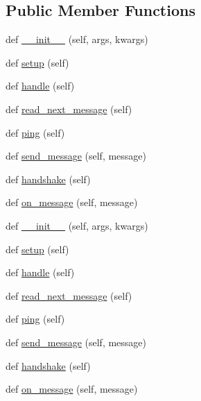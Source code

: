 \subsection*{Public Member Functions}
\begin{DoxyCompactItemize}
\item 
def \hyperlink{classremi_1_1server_1_1WebSocketsHandler_a371b691e09202b87433ad51511a0c4dc}{\+\_\+\+\_\+init\+\_\+\+\_\+} (self, args, kwargs)
\item 
def \hyperlink{classremi_1_1server_1_1WebSocketsHandler_ab2bb6df8b17cbc903501b01fb4c3a16f}{setup} (self)
\item 
def \hyperlink{classremi_1_1server_1_1WebSocketsHandler_adec606e39a364bb1aae70012ccc1e7e3}{handle} (self)
\item 
def \hyperlink{classremi_1_1server_1_1WebSocketsHandler_a4492877918dd165efb893c71c50c050e}{read\+\_\+next\+\_\+message} (self)
\item 
def \hyperlink{classremi_1_1server_1_1WebSocketsHandler_a017234847483aa2deb00deb662f6b79f}{ping} (self)
\item 
def \hyperlink{classremi_1_1server_1_1WebSocketsHandler_a075bfc8ffadfcb75f3ed72c1c4a87855}{send\+\_\+message} (self, message)
\item 
def \hyperlink{classremi_1_1server_1_1WebSocketsHandler_a8bfe922a07ddf34d4aa073060b88ba31}{handshake} (self)
\item 
def \hyperlink{classremi_1_1server_1_1WebSocketsHandler_a8e95507cca3bcf57815a591bd6486736}{on\+\_\+message} (self, message)
\item 
def \hyperlink{classremi_1_1server_1_1WebSocketsHandler_a371b691e09202b87433ad51511a0c4dc}{\+\_\+\+\_\+init\+\_\+\+\_\+} (self, args, kwargs)
\item 
def \hyperlink{classremi_1_1server_1_1WebSocketsHandler_ab2bb6df8b17cbc903501b01fb4c3a16f}{setup} (self)
\item 
def \hyperlink{classremi_1_1server_1_1WebSocketsHandler_adec606e39a364bb1aae70012ccc1e7e3}{handle} (self)
\item 
def \hyperlink{classremi_1_1server_1_1WebSocketsHandler_a4492877918dd165efb893c71c50c050e}{read\+\_\+next\+\_\+message} (self)
\item 
def \hyperlink{classremi_1_1server_1_1WebSocketsHandler_a017234847483aa2deb00deb662f6b79f}{ping} (self)
\item 
def \hyperlink{classremi_1_1server_1_1WebSocketsHandler_a075bfc8ffadfcb75f3ed72c1c4a87855}{send\+\_\+message} (self, message)
\item 
def \hyperlink{classremi_1_1server_1_1WebSocketsHandler_a8bfe922a07ddf34d4aa073060b88ba31}{handshake} (self)
\item 
def \hyperlink{classremi_1_1server_1_1WebSocketsHandler_a8e95507cca3bcf57815a591bd6486736}{on\+\_\+message} (self, message)
\end{DoxyCompactItemize}
